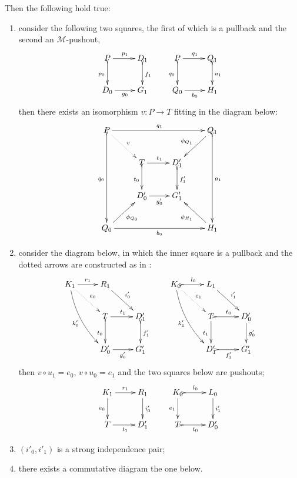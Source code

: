 \begin{lemma}
	Then the following hold true:
	\begin{enumerate}
		\item consider the following two squares, the first of which is a pullback and the second an $\mathcal{M}$-pushout,
		\[\xymatrix{P \ar[r]^{p_1} \ar@{>->}[d]_{p_0} & D_1 \ar@{>->}[d]^{f_1}& P \ar[r]^{q_1} \ar@{>->}[d]_{q_0} & Q_1 \ar@{>->}[d]^{a_1}\\ D_0 \ar[r]_{g_0} & G_1&Q_0 \ar[r]_{b_0} & H_1}\]
		then there exists an isomorphism $v\colon P\to T$ fitting in the diagram below:
		\[\xymatrix{ P \ar@{.>}[dr]^{v} \ar[rrr]^{q_1} \ar@{>->}[ddd]_{q_0}&&& Q_1 \ar@{>->}[ddd]^{a_1} \ar[dl]_{\phi_{Q_1}}\\&T \ar@{>->}[d]_{t_0}\ar[r]^{t_1}& D'_1 \ar@{>->}[d]^{f'_1} \\ & D'_0\ar[r]_{g'_0} & G'_1\\Q_0 \ar[rrr]_{b_0} \ar[ur]_{\phi_{Q_0}}&&& H_1 \ar[ul]^{\phi_{H_1}}}\]
		
		\item consider the diagram below, in which the inner square is a pullback and the dotted arrows are constructed as in :
		\[\xymatrix{K_1 \ar[r]^{r_1} \ar@/_.3cm/[ddr]_{k'_0} \ar@{.>}[dr]^{e_0}& R_1  \ar[dr]^{i'_0}  && K_0 \ar@{>->}[r]^{l_0} \ar@/_.3cm/[ddr]_{k'_1} \ar@{.>}[dr]^{e_1}& L_1  \ar[dr]^{i'_1} \\& T\ar@{>->}[d]_{t_0} \ar[r]^{t_1}& D'_1  \ar@{>->}[d]^{f'_1} && T \ar@{>->}[r]^{t_0} \ar[d]_{t_1}& D'_0 \ar[d]^{g'_0}\\&D'_0 \ar[r]_{g'_0} & G'_1 && D'_1\ar@{>->}[r]_{f'_1} & G'_1}\]
		then $v\circ u_1=e_0$, $v\circ u_0=e_1$ and the two squares below are pushouts;
		\[\xymatrix{K_1  \ar[d]_{e_0} \ar[r]^{r_1} & R_1 \ar[d]^{i'_0} & K_0 \ar@{>->}[r]^{l_0} \ar[d]_{e_1}& L_0 \ar[d]^{i'_1}\\ T \ar[r]_{t_1}  & D'_1 & T \ar@{>->}[r]_{t_0} & D'_0 }\]
				
	\item $(i'_0, i'_1)$ is a strong independence pair;
	
	\item there exists a commutative diagram the one below.
	

\end{enumerate}
\end{lemma}
